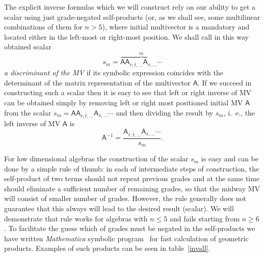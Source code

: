 \documentclass{birkjour}
\def\m#1{\mathsf{#1}} %
\begin{document}
The explicit inverse formulas which we will construct rely on our
ability to get a scalar using just grade-negated self-products
(or, as we shall see, some multilinear combinations of them for
$n>5$), where initial multivector is a mandatory and located
either in the left-most or right-most position. We shall call in
this way obtained scalar
\begin{equation}\label{discriminant}
s_m=\overbrace{\m{A}\m{A}_{\bar r,\bar t,\ldots}\m{A}_{\bar
s,\ldots}\cdots}^m \end{equation}  \textit{a discriminant of the
MV} if its symbolic expression coincides with the determinant of
the matrix representation of the multivector $\m{A}$. If we succeed in
constructing such a scalar then it is easy to see that left or
right inverse of MV can be obtained simply by removing left or
right  most positioned initial MV $\m{A}$ from the scalar
$s_m=\m{A}\m{A}_{\bar r,\bar t,\ldots}\m{A}_{\bar s,\ldots}\cdots$
and then dividing the result by $s_m$, i.~e., the left inverse of MV $\m{A}$
is
\begin{equation}\label{inverse}
\m{A}^{-1}=\frac{\m{A}_{\bar r,\bar t,\ldots}\m{A}_{\bar
s,\ldots}\cdots}{s_m}.\end{equation}

For low dimensional algebras the construction of the scalar $s_m$
is easy and can be done by a simple rule of thumb: in each of
intermediate steps of construction,  the self-product of two terms
should not repeat previous grades  and at the same time should
eliminate a sufficient number of remaining grades, so that the
midway MV will consist of smaller number of grades. However, the
rule generally does not guarantee that this always will lead to the desired result
(scalar). We will demonstrate that rule works for algebras with
$n\le5$ and fails starting from $n\ge6$. To facilitate the guess
which of grades must  be negated in the self-products we have
written \textit{Mathematica} symbolic
program~\cite{AcusDargys2017} for fast calculation of geometric
products. Examples of such products can be seen in
table~\ref{invall}.
\end{document}
